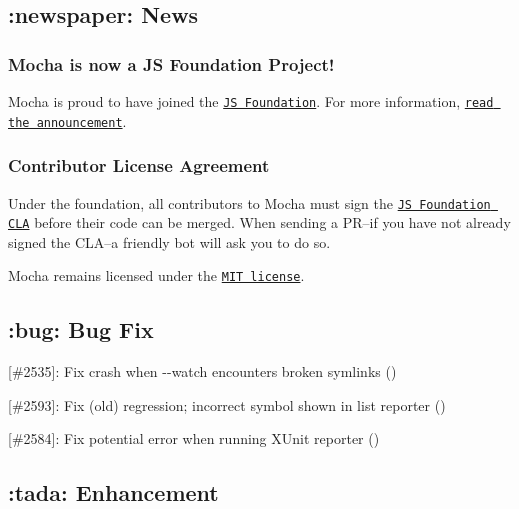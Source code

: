 \subsection*{\+:newspaper\+: News}

\subsubsection*{Mocha is now a JS Foundation Project!}

Mocha is proud to have joined the \href{https://js.foundation}{\tt JS Foundation}. For more information, \href{https://js.foundation/announcements/2016/10/17/Linux-Foundation-Unites-JavaScript-Community-Open-Web-Development/}{\tt read the announcement}.

\subsubsection*{Contributor License Agreement}

Under the foundation, all contributors to Mocha must sign the \href{https://js.foundation/CLA/}{\tt JS Foundation C\+LA} before their code can be merged. When sending a PR--if you have not already signed the C\+LA--a friendly bot will ask you to do so.

Mocha remains licensed under the \href{https://github.com/mochajs/mocha/blob/master/LICENSE}{\tt M\+IT license}.

\subsection*{\+:bug\+: Bug Fix}


\begin{DoxyItemize}
\item \mbox{[}\#2535\mbox{]}\+: Fix crash when {\ttfamily -\/-\/watch} encounters broken symlinks (\href{https://github.com/villesau}{\tt })
\item \mbox{[}\#2593\mbox{]}\+: Fix (old) regression; incorrect symbol shown in {\ttfamily list} reporter (\href{https://github.com/Aldaviva}{\tt })
\item \mbox{[}\#2584\mbox{]}\+: Fix potential error when running X\+Unit reporter (\href{https://github.com/vobujs}{\tt })
\end{DoxyItemize}

\subsection*{\+:tada\+: Enhancement}


